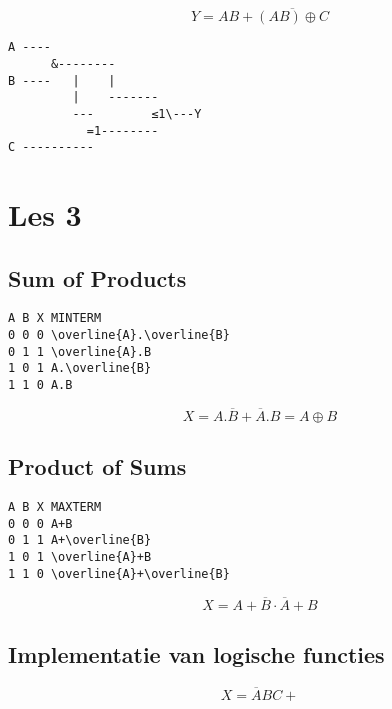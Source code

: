 \documentclass[11pt, a4paper]{article}
\begin{document}


$$Y=AB+\overline{(AB) \oplus C}$$

\begin{verbatim}
A ----
      &--------
B ----   |    |
         |    -------
         ---        ≤1\---Y
           =1--------
C ----------
\end{verbatim}

\newpage

\section{Les 3}

\subsection{Sum of Products}

\begin{verbatim}
A B X MINTERM
0 0 0 \overline{A}.\overline{B}
0 1 1 \overline{A}.B
1 0 1 A.\overline{B}
1 1 0 A.B
\end{verbatim}

$$X = A.\overline{B} + \overline{A}.B = A  \oplus  B$$


\subsection{Product of Sums}

\begin{verbatim}
A B X MAXTERM
0 0 0 A+B
0 1 1 A+\overline{B}
1 0 1 \overline{A}+B
1 1 0 \overline{A}+\overline{B}
\end{verbatim}

$$X = A+\overline{B} \cdot \overline{A}+B $$



\subsection{Implementatie van logische functies}

$$ X = \overline{A}BC + $$

\newpage
\end{document}

